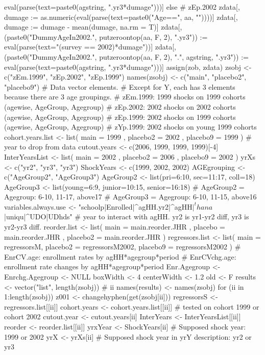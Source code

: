 \begin{Schunk}
\begin{Sinput}
{{{{          eval(parse(text=paste0(agstring, ".yr3*dumage")))] 
      } else { # zEp.2002
        zdata[, dumage := as.numeric(eval(parse(text=paste0("Age==", aa, ""))))]
        zdata[, dumage := dumage - mean(dumage, na.rm = T)]
        zdata[, (paste0("DummyAgeIn2002.", putzeroontop(aa, F, 2), ".yr3")) :=
          eval(parse(text="(survey == 2002)*dumage"))] 
        zdata[, (paste0("DummyAgeIn2002.", putzeroontop(aa, F, 2), ".", agstring, ".yr3")) :=
          eval(parse(text=paste0(agstring, ".yr3*dumage")))] 
      }
    }
  }
  assign(zob, zdata)
}
zsobj <- c("zEm.1999", "zEp.2002", "zEp.1999")
names(zsobj) <- c("main", "placebo2", "placebo9")
# Data vector elements. 
# Except for Y, each has 3 elements because there are 3 age groupings.
# zEm.1999: 1999 shocks on 1999 cohorts (agewise, AgeGroup, Agegroup)
# zEp.2002: 2002 shocks on 2002 cohorts (agewise, AgeGroup, Agegroup)
# zEp.1999: 2002 shocks on 1999 cohorts (agewise, AgeGroup, Agegroup)
# zYp.1999: 2002 shocks on young 1999 cohorts
cohort.years.list <- list(
    main = 1999
  , placebo2 = 2002
  , placebo9 = 1999
)
# year to drop from data
cutout.years <- c(2006, 1999, 1999, 1999)[-4]
InterYearsList <- list(
    main = 2002
  , placebo2 = 2006
  , placebo9 = 2002
)
yrXs <- c("yr2", "yr3", "yr3")
ShockYears <- c(1999, 2002, 2002)
AGEgrouping <- c("AgeGroup2", "AgeGroup3")
AgeGroup2 <- list(pri=6:10, sec=11:17, coll=18)
AgeGroup3 <- list(young=6:9, junior=10:15, senior=16:18)
  # AgeGroup2 = Agegroup: 6-10, 11-17, above17
  # AgeGroup3 = Agegroup: 6-10, 11-15, above16
variables.always.use <- "schoolp|Enrolled|^agHH.yr2|^agHH$|^thana$|uniqu|^UDO|UDhds"
# year to interact with agHH. yr2 is yr1-yr2 diff, yr3 is yr2-yr3 diff.
reorder.list <- list(
    main = main.reorder.JHR
  , placebo = main.reorder.JHR
  , placebo2 = main.reorder.JHR
)
regressors.list <- list(
  main = regressorsM,
  placebo2 = regressorsM2002,
  placebo9 = regressorsM2002
)
# EnrCV.age: enrollment rates by agHH*agegroup*period
# EnrCVchg.age: enrollment rate changes by agHH*agegroup*period
Enr.Agegroup <- Enrchg.Agegroup <- NULL
boxWidth <- 4
centerWidth <- 1.2
old <- F
results <- vector("list", length(zsobj)) # ii
names(results) <- names(zsobj)
for (ii in 1:length(zsobj)) {
  z001 <- changehyphen(get(zsobj[ii]))
  regressorsS <-  regressors.list[[ii]]
  cohort.years <- cohort.years.list[[ii]] # tested on cohort 1999 or cohort 2002
  cutout.year <- cutout.years[ii]
  InterYears <- InterYearsList[[ii]]
  reorder <- reorder.list[[ii]]
  yrxYear <- ShockYears[ii] # Supposed shock year: 1999 or 2002
  yrX <- yrXs[ii]  # Supposed shock year in yrY description: yr2 or yr3
}
\end{Sinput}
\end{Schunk}
